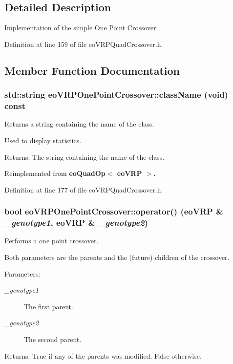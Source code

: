 \subsection{Detailed Description}
Implementation of the simple One Point Crossover. 



Definition at line 159 of file eo\-VRPQuad\-Crossover.h.

\subsection{Member Function Documentation}
\subsubsection{\setlength{\rightskip}{0pt plus 5cm}std::string eo\-VRPOne\-Point\-Crossover::class\-Name (void) const\hspace{0.3cm}{\tt  [inline, virtual]}}\label{classeo_v_r_p_one_point_crossover_a62bc52e6f36d7fae7c192173fbfd2dc}


Returns a string containing the name of the class. 

Used to display statistics. \begin{Desc}
\item[Returns:]The string containing the name of the class. \end{Desc}


Reimplemented from \bf{eo\-Quad\-Op$<$ eo\-VRP $>$}.

Definition at line 177 of file eo\-VRPQuad\-Crossover.h.
\subsubsection{\setlength{\rightskip}{0pt plus 5cm}bool eo\-VRPOne\-Point\-Crossover::operator() (\bf{eo\-VRP} \& {\em \_\-genotype1}, \bf{eo\-VRP} \& {\em \_\-genotype2})\hspace{0.3cm}{\tt  [inline, virtual]}}\label{classeo_v_r_p_one_point_crossover_b930b5d9a8ee0719f675f9eea791579b}


Performs a one point crossover. 

Both parameters are the parents and the (future) children of the crossover. \begin{Desc}
\item[Parameters:]
\begin{description}
\item[{\em \_\-genotype1}]The first parent. \item[{\em \_\-genotype2}]The second parent. \end{description}
\end{Desc}
\begin{Desc}
\item[Returns:]True if any of the parents was modified. False otherwise. \end{Desc}


